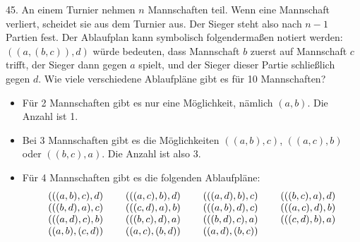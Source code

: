 \begin{problem}{45.}
	An einem Turnier nehmen $n$ Mannschaften teil. Wenn eine Mannschaft verliert, scheidet sie aus dem Turnier aus. Der Sieger steht also nach $n-1$ Partien fest.
	Der Ablaufplan kann symbolisch folgendermaßen notiert werden: $((a,(b,c)),d)$ würde bedeuten, dass Mannschaft $b$ zuerst  auf Mannschaft $c$ trifft, der Sieger dann gegen $a$ spielt, und der Sieger dieser Partie schließlich gegen $d$.
	Wie viele verschiedene Ablaufpläne gibt es für 10 Mannschaften?
	\begin{itemize}
		\item Für 2 Mannschaften gibt es nur eine Möglichkeit, nämlich $(a,b)$. Die Anzahl ist 1.
		\item Bei 3 Mannschaften gibt es die Möglichkeiten $((a,b),c)$, $((a,c),b)$ oder $((b,c),a)$. Die Anzahl ist also 3.
		\item Für 4 Mannschaften gibt es die folgenden Ablaufpläne:
			\begin{equation*}
				\begin{array}{@{}cccc@{}}
					(((a,b),c),d) & \quad\;(((a,c),b),d) & \quad\;(((a,d),b),c) & \quad\;(((b,c),a),d) \\
					(((b,d),a),c) & \quad\;(((c,d),a),b) & \quad\;(((a,b),d),c) & \quad\;(((a,c),d),b) \\
					(((a,d),c),b) & \quad\;(((b,c),d),a) & \quad\;(((b,d),c),a) & \quad\;(((c,d),b),a) \\
					((a,b),(c,d)) & \quad\;((a,c),(b,d)) & \quad\;((a,d),(b,c))
				\end{array}
			\end{equation*}
	\end{itemize}
\end{problem}

